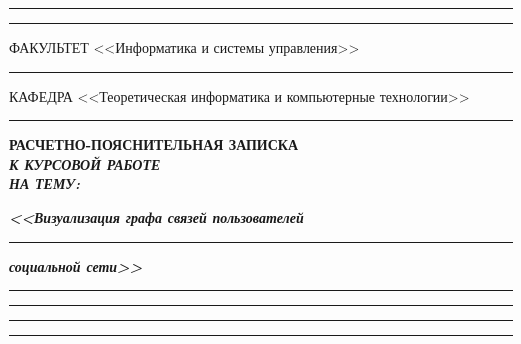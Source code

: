 \documentclass[14pt, russian]{scrartcl}
\begin{document}
\begin{titlepage}
\vspace{-2pt}
\hspace{-34.5pt}\rule{\textwidth}{2.5pt}

\vspace*{-20.3pt}
\hspace{-34.5pt}\rule{\textwidth}{0.4pt}
 
\vspace{0.5ex}
\noindent \small ФАКУЛЬТЕТ\hspace{80pt} <<Информатика и системы управления>>

\vspace*{-16pt}
\hspace{35pt}\rule{0.855\textwidth}{0.4pt}

\vspace{0.5ex}
\noindent \small КАФЕДРА\hspace{50pt} <<Теоретическая информатика и компьютерные технологии>>

\vspace*{-16pt}
\hspace{25pt}\rule{0.875\textwidth}{0.4pt}
 
 
\vspace{3em}
 
\begin{center}
\Large \bf{РАСЧЕТНО-ПОЯСНИТЕЛЬНАЯ ЗАПИСКА\\\textbf{\textit{К КУРСОВОЙ РАБОТЕ\\НА ТЕМУ:}} \\}
\end{center}

\vspace*{-6ex} 
\begin{center}
\Large{\textit{\textbf{<<Визуализация графа связей пользователей }}}

\vspace*{-3ex}
\rule{0.9\textwidth}{1.2pt}

\vspace*{-0.2ex}
\Large{\textit{\textbf{социальной сети>>}}}
\vspace*{-3ex}
\vspace*{-0.2ex}
\rule{0.9\textwidth}{1.2pt}

\vspace*{-0.2ex}
\rule{0.9\textwidth}{1.2pt}

\vspace*{-0.2ex}
\rule{0.9\textwidth}{1.2pt}

\vspace*{-0.2ex}
\rule{0.9\textwidth}{1.2pt}
\end{center}
 

\end{titlepage}
\end{document}
